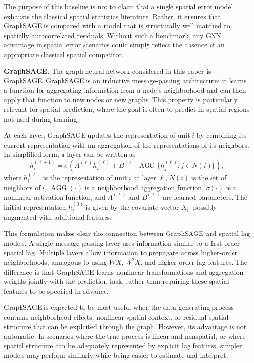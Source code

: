 \documentclass[ASNA, twocolumn]{USG} %
\begin{document}
The purpose of this baseline is not to claim that a single spatial error model exhausts the classical spatial statistics literature. Rather, it ensures that GraphSAGE is compared with a model that is structurally well matched to spatially autocorrelated residuals. Without such a benchmark, any GNN advantage in spatial error scenarios could simply reflect the absence of an appropriate classical spatial competitor.

\noindent \textbf{GraphSAGE.}
The graph neural network considered in this paper is GraphSAGE. GraphSAGE is an inductive message-passing architecture: it learns a function for aggregating information from a node's neighborhood and can then apply that function to new nodes or new graphs. This property is particularly relevant for spatial prediction, where the goal is often to predict in spatial regions not used during training.

At each layer, GraphSAGE updates the representation of unit \(i\) by combining its current representation with an aggregation of the representations of its neighbors. In simplified form, a layer can be written as
\[
h_i^{(\ell+1)} = \sigma\left( A^{(\ell)} h_i^{(\ell)} + B^{(\ell)} \operatorname{AGG} \{h_j^{(\ell)}: j \in N(i)\} \right),
\]
where \(h_i^{(\ell)}\) is the representation of unit \(i\) at layer \(\ell\), \(N(i)\) is the set of neighbors of \(i\), \(\operatorname{AGG}(\cdot)\) is a neighborhood aggregation function, \(\sigma(\cdot)\) is a nonlinear activation function, and \(A^{(\ell)}\) and \(B^{(\ell)}\) are learned parameters. The initial representation \(h_i^{(0)}\) is given by the covariate vector \(X_i\), possibly augmented with additional features.

This formulation makes clear the connection between GraphSAGE and spatial lag models. A single message-passing layer uses information similar to a first-order spatial lag. Multiple layers allow information to propagate across higher-order neighborhoods, analogous to using \(WX\), \(W^2X\), and higher-order lag features. The difference is that GraphSAGE learns nonlinear transformations and aggregation weights jointly with the prediction task, rather than requiring these spatial features to be specified in advance.

GraphSAGE is expected to be most useful when the data-generating process contains neighborhood effects, nonlinear spatial context, or residual spatial structure that can be exploited through the graph. However, its advantage is not automatic. In scenarios where the true process is linear and nonspatial, or where spatial structure can be adequately represented by explicit lag features, simpler models may perform similarly while being easier to estimate and interpret.
\end{document}
